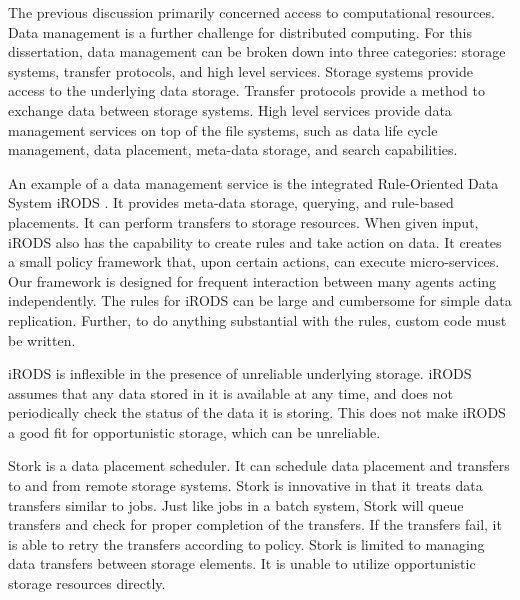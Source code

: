 
The previous discussion primarily concerned access to computational resources.  Data management is a further challenge for distributed computing.  For this dissertation, data management can be broken down into three categories: storage systems, transfer protocols, and high level services.  Storage systems provide access to the underlying data storage.  Transfer protocols provide a method to exchange data between storage systems.  High level services provide data management services on top of the file systems, such as data life cycle management, data placement, meta-data storage, and search capabilities.

An example of a data management service is the integrated Rule-Oriented Data System iRODS \cite{rajasekar2010irods}.  It provides meta-data storage, querying, and rule-based placements.  It can perform transfers to storage resources.  When given input, iRODS also has the capability to create rules and take action on data.  It creates a small policy framework that, upon certain actions, can execute micro-services.  Our framework is designed for frequent interaction between many agents acting independently.  The rules for iRODS can be large and cumbersome for simple data replication.  Further, to do anything substantial with the rules, custom code must be written.

iRODS is inflexible in the presence of unreliable underlying storage.  iRODS assumes that any data stored in it is available at any time, and does not periodically check the status of the data it is storing.  This does not make iRODS a good fit for opportunistic storage, which can be unreliable.  

Stork \cite{kosar2004stork} is a data placement scheduler.  It can schedule data placement and transfers to and from remote storage systems.  Stork is innovative in that it treats data transfers similar to jobs.  Just like jobs in a batch system, Stork will queue transfers and check for proper completion of the transfers.  If the transfers fail, it is able to retry the transfers according to policy.  Stork is limited to managing data transfers between storage elements.  It is unable to utilize opportunistic storage resources directly.

